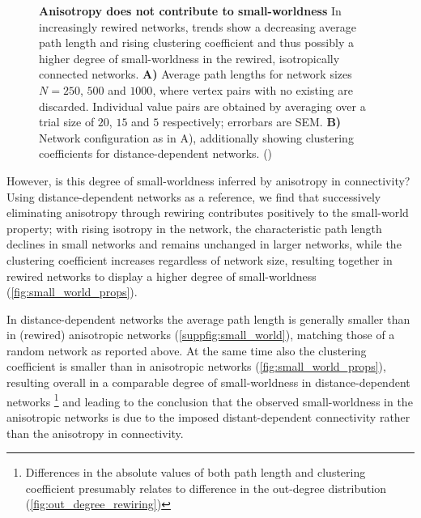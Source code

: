 \begin{figure}[H]
  \centering
  \captionsetup{skip=8pt}
  \caption{\textbf{Anisotropy does not contribute to small-worldness}
    In increasingly rewired networks, trends show a decreasing average
    path length and rising clustering coefficient and thus possibly a
    higher degree of small-worldness in the rewired, isotropically
    connected networks.  \textbf{A)} Average path lengths for network
    sizes $N=250$, $500$ and $1000$, where vertex pairs with no
    existing are discarded. Individual value pairs are obtained by
    averaging over a trial size of $20$, $15$ and $5$ respectively;
    errorbars are SEM. \textbf{B)} Network configuration as in A),
    additionally showing clustering coefficients for
    distance-dependent networks.
    ()} %
  \label{fig:small_world_props}
\end{figure} 

However, is this degree of small-worldness inferred by anisotropy in
connectivity? Using distance-dependent networks as a reference, we
find that successively eliminating anisotropy through rewiring
contributes positively to the small-world property; with rising
isotropy in the network, the characteristic path length declines in
small networks and remains unchanged in larger networks, while the
clustering coefficient increases regardless of network size, resulting
together in rewired networks to display a higher degree of
small-worldness (\autoref{fig:small_world_props}).


In distance-dependent networks the average path length is generally
smaller than in (rewired) anisotropic networks
(\autoref{suppfig:small_world}), matching those of a random network as
reported above. At the same time also the clustering coefficient is
smaller than in anisotropic networks
(\autoref{fig:small_world_props}), resulting overall in a comparable
degree of small-worldness in distance-dependent networks
\footnote{Differences in the absolute values of both path length and
  clustering coefficient presumably relates to difference in the
  out-degree distribution (\autoref{fig:out_degree_rewiring})} and
leading to the conclusion that the observed small-worldness in the
anisotropic networks is due to the imposed distant-dependent
connectivity rather than the anisotropy in connectivity.







